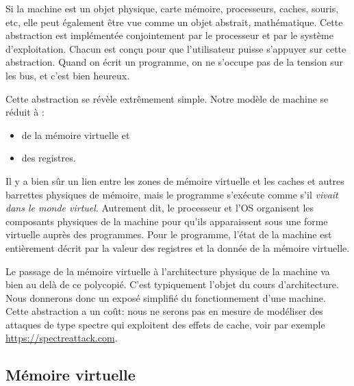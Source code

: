 \documentclass{book}
\begin{document}
Si la machine est un objet physique, carte mémoire, processeurs, caches, souris, etc, elle peut également être vue comme un objet abstrait, mathématique. Cette abstraction est implémentée conjointement par le processeur et par le système d'exploi\-tation. Chacun est conçu pour que l'utilisateur puisse s'appuyer sur cette abstraction. Quand on écrit un programme, on ne s'occupe pas de la tension sur les bus, et c'est bien heureux.

Cette abstraction se révèle extrêmement simple. Notre modèle de machine se réduit à :
\begin{itemize}
	\item de la mémoire virtuelle et
	\item  des registres. 
\end{itemize}

Il y a bien sûr un lien entre les zones de mémoire virtuelle et les caches et autres barrettes physiques de mémoire, mais le programme s'exécute comme s'il \emph{vivait dans le monde virtuel}. Autrement dit, le processeur et l'OS organisent les composants physiques de la machine pour qu'ils apparaissent sous une forme virtuelle auprès des programmes. Pour le programme, l'état de la machine est entièrement décrit par la valeur des registres et la donnée de la mémoire virtuelle. 

Le passage de la mémoire virtuelle à l'architecture physique de la machine va bien au delà de ce polycopié. C'est typiquement l'objet du cours d'architecture. Nous donnerons donc un exposé simplifié du fonctionnement d'une machine. Cette abstraction a un coût: nous ne serons pas en mesure de modéliser des attaques de type {\sc spectre} qui exploitent des effets de cache, voir par exemple \url{https://spectreattack.com}. %


\subsection{Mémoire virtuelle}
\end{document}
